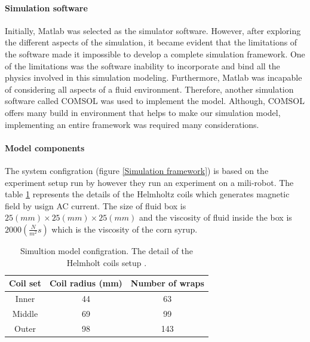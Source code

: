 \documentclass[12pt,a4paper,titlepage]{report}
\newcommand{\head}[1]{\textnormal{\textbf{#1}}}
\begin{document}
\paragraph{Simulation software}
Initially, Matlab was selected as the simulator software. However, after exploring the different aspects
 of the simulation, it became evident that the limitations of the software made it impossible to develop a complete simulation
 framework. One of the limitations was the software inability to incorporate and bind all the physics involved in this simulation 
modeling. Furthermore, Matlab was incapable of considering all aspects of a fluid environment. Therefore, 
another simulation software called COMSOL was used to implement the model. Although, COMSOL offers 
many build in environment that helps to make our simulation model, implementing an entire framework was 
required many considerations. 

\paragraph{Model components}

 The system configration (figure \ref{Simulation framework}) is based on the experiment setup
run by \citeauthor{mahoney2011velocity} however they run an experiment on a mili-robot. The table \ref{Simultion model configration} represents the details 
of the Helmholtz coils which generates magnetic field by usign AC current. The size of 
fluid box is $25 (mm) \times 25(mm) \times 25 (mm)$ and the viscosity of fluid inside the box is $2000 (\frac{N}{m^2} s)$
which is the viscosity of the corn syrup. 





\begin{table}[!ht]

\centering%
{
\begin{tabular}{c c c }%
\toprule[2.0pt]



\head{Coil set} & \head{Coil radius (mm)} & \head{Number of wraps} \\

\midrule
Inner 	& 	    	44	  & 	63		\\%
Middle	& 	69		  & 	99	\\
Outer & 	98 		  & 	143	\\[1ex]%



\bottomrule[2.0pt]
\end{tabular}
}
\label{Simultion model configration}%
\caption[Simultion model configration]{Simultion model configration. The detail of the Helmholt coils setup
\citep{mahoney2011velocity}.}\label{Simultion model configration}%
\end{table}
\end{document}

